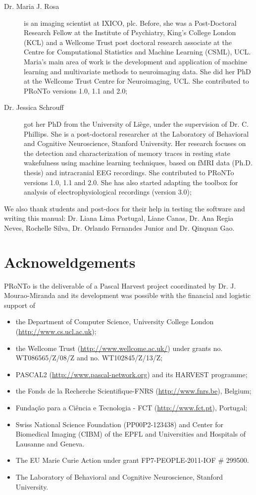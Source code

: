 \begin{description}
	\item[Dr. Maria J. Rosa] is an imaging scientist at IXICO, plc. Before, she was a Post-Doctoral Research Fellow at the Institute of Psychiatry, King's College London (KCL) and a Wellcome Trust post doctoral research associate at the Centre for Computational Statistics and Machine Learning (CSML), UCL. Maria's main area of work is the development and application of machine learning and multivariate methods to neuroimaging data. She did her PhD at the Wellcome Trust Centre for Neuroimaging, UCL. She contributed to PRoNTo versions 1.0, 1.1 and 2.0;
	\item[Dr. Jessica Schrouff] got her PhD from the University of Li\`ege, under the supervision of Dr. C. Phillips. She is a post-doctoral researcher at the Laboratory of Behavioral and Cognitive Neuroscience, Stanford University. Her research focuses on the detection and characterization of memory traces in resting state wakefulness using machine learning techniques, based on fMRI data (Ph.D. thesis) and intracranial EEG recordings. She contributed to PRoNTo versions 1.0, 1.1 and 2.0. She has also started adapting the toolbox for analysis of electrophysiological recordings (version 3.0);
\end{description}

We also thank students and post-docs for their help in testing the software and writing this manual: Dr. Liana Lima Portugal, Liane Canas, Dr. Ana Regia Neves, Rochelle Silva, Dr. Orlando Fernandes Junior and Dr. Qinquan Gao. 

\section{Acknoweldgements}
PRoNTo is the deliverable of a Pascal Harvest project coordinated by Dr. J. Mourao-Miranda and its development was possible with the financial and logistic support of 
\begin{itemize}
\item the Department of Computer Science, University College London  (\url{http://www.cs.ucl.ac.uk});
\item the Wellcome Trust (\url{http://www.wellcome.ac.uk/}) under grants no. WT086565/Z/08/Z and no. WT102845/Z/13/Z;
\item PASCAL2 (\url{http://www.pascal-network.org}) and its HARVEST programme;
\item the Fonds de la Recherche Scientifique-FNRS (\url{http://www.fnrs.be}), Belgium;
\item Funda\c{c}\~{a}o para a Ci\^{e}ncia e Tecnologia - FCT (\url{http://www.fct.pt}), Portugal;
\item Swiss National Science Foundation (PP00P2-123438) and Center for   Biomedical Imaging (CIBM) of the EPFL and Universities and Hospitals  of Lausanne and Geneva.
\item The EU Marie Curie Action under grant FP7-PEOPLE-2011-IOF \# 299500.
\item The Laboratory of Behavioral and Cognitive Neuroscience, Stanford University.
\end{itemize}

